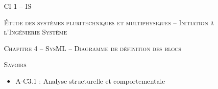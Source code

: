 \documentclass[11pt,oneside]{article}
\begin{document}
\pagestyle{fancy}
\renewcommand{\headrulewidth}{0pt}

\fancyhead{}


\fancyhead[C]{\rule{12cm}{.5pt}}


\renewcommand{\footrulewidth}{0.2pt}

\fancyfoot[C]{\footnotesize{\bfseries \thepage}}



\begin{center}
 \huge\textsc{CI 1 -- IS}

 \large\textsc{Étude des systèmes pluritechniques et multiphysiques -- Initiation à l'Ingénierie Système}
\end{center}

\begin{center}
 \LARGE\textsc{Chapitre 4 -- SysML -- Diagramme de définition des blocs}
\end{center}


\vspace{.5cm}


\begin{savoir}
\textsc{Savoirs}
\begin{itemize}
\item A-C3.1 : Analyse structurelle et comportementale
\end{itemize}
\end{savoir}
\end{document}
